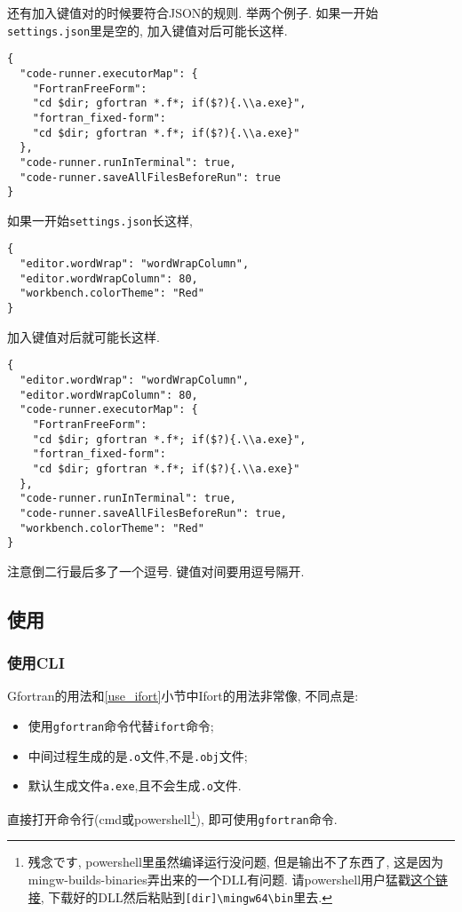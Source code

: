 还有加入键值对的时候要符合JSON的规则. 举两个例子.
如果一开始\verb|settings.json|里是空的, 加入键值对后可能长这样.
\begin{verbatim}
{
  "code-runner.executorMap": {
    "FortranFreeForm":
    "cd $dir; gfortran *.f*; if($?){.\\a.exe}",
    "fortran_fixed-form":
    "cd $dir; gfortran *.f*; if($?){.\\a.exe}"
  },
  "code-runner.runInTerminal": true,
  "code-runner.saveAllFilesBeforeRun": true
}
\end{verbatim}
如果一开始\verb|settings.json|长这样,
\begin{verbatim}
{
  "editor.wordWrap": "wordWrapColumn",
  "editor.wordWrapColumn": 80,
  "workbench.colorTheme": "Red"
}
\end{verbatim}
加入键值对后就可能长这样.
\begin{verbatim}
{
  "editor.wordWrap": "wordWrapColumn",
  "editor.wordWrapColumn": 80,
  "code-runner.executorMap": {
    "FortranFreeForm":
    "cd $dir; gfortran *.f*; if($?){.\\a.exe}",
    "fortran_fixed-form":
    "cd $dir; gfortran *.f*; if($?){.\\a.exe}"
  },
  "code-runner.runInTerminal": true,
  "code-runner.saveAllFilesBeforeRun": true,
  "workbench.colorTheme": "Red"
}
\end{verbatim}
注意倒二行最后多了一个逗号. 键值对间要用逗号隔开.

\subsection{使用}\label{use_gfortran}

\subsubsection{使用CLI}
Gfortran的用法和\ref{use_ifort}小节中Ifort的用法非常像, 不同点是:
\begin{itemize}
  \item 使用\verb|gfortran|命令代替\verb|ifort|命令;
  \item 中间过程生成的是\verb|.o|文件,不是\verb|.obj|文件;
  \item 默认生成文件\verb|a.exe|,且不会生成\verb|.o|文件.
\end{itemize}

直接打开命令行(cmd或powershell\footnote{残念です, powershell里虽然编译运行没问题, 但是输出不了东西了, 这是因为mingw-builds-binaries弄出来的一个DLL有问题. 请powershell用户猛戳\href{https://github.com/GasinAn/mingw64_gfortran_dll/archive/refs/heads/main.zip}{这个链接}, 下载好的DLL然后粘贴到\texttt{[dir]\textbackslash mingw64\textbackslash bin}里去.}), 即可使用\verb|gfortran|命令.

